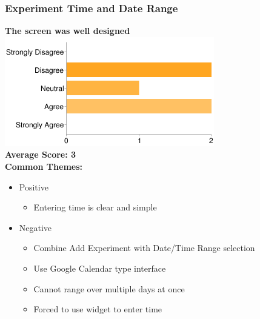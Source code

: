 \subsubsection{Experiment Time and Date Range}
\textbf{The screen was well designed}\\
\includegraphics[page=1,scale=0.65]{../other/usability-report-charts/select_experiment_date_time_bar_chart}\\
\textbf{Average Score: 3}\\
\textbf{Common Themes:}
\begin{itemize}
\item Positive
\begin{itemize}
\item Entering time is clear and simple
\end{itemize}
\item Negative
\begin{itemize}
\item Combine Add Experiment with Date/Time Range selection
\item Use Google Calendar type interface
\item Cannot range over multiple days at once
\item Forced to use widget to enter time
\end{itemize}
\end{itemize}

